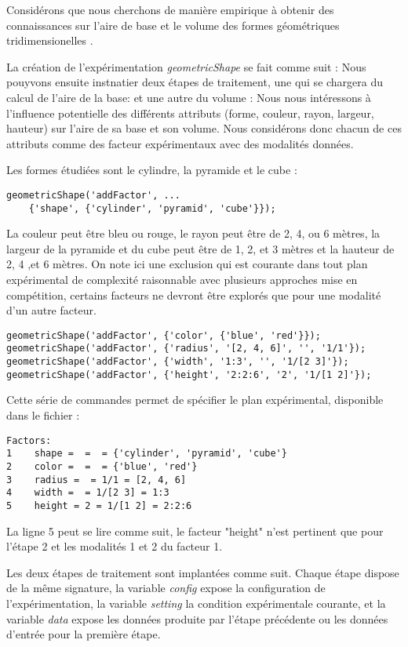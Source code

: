Considérons que nous cherchons de manière empirique à obtenir des connaissances sur l'aire de base et le volume des formes géométriques tridimensionelles .

La création de l'expérimentation \textsl{geometricShape} se fait comme suit :
Nous pouyvons ensuite instnatier deux étapes de traitement, une qui se chargera du calcul de l'aire de la base:
et une autre du volume :
Nous nous intéressons à l'influence potentielle des différents attributs (forme, couleur, rayon, largeur, hauteur) sur l'aire de sa base et son volume. Nous considérons donc chacun de ces attributs comme des facteur expérimentaux avec des modalités données.

Les formes étudiées sont le cylindre, la pyramide et le cube :
\begin{lstlisting}
geometricShape('addFactor', ...
	{'shape', {'cylinder', 'pyramid', 'cube'}});
\end{lstlisting}
La couleur peut être bleu ou rouge, le rayon peut être de 2, 4, ou 6 mètres, la largeur de la pyramide et du cube peut être de 1, 2, et 3 mètres et la hauteur de 2, 4 ,et 6 mètres. On note ici une exclusion qui est courante dans tout plan expérimental de complexité raisonnable avec plusieurs approches mise en compétition, certains facteurs ne devront être explorés que pour une modalité d'un autre facteur.
\begin{lstlisting}
geometricShape('addFactor', {'color', {'blue', 'red'}});
geometricShape('addFactor', {'radius', '[2, 4, 6]', '', '1/1'});
geometricShape('addFactor', {'width', '1:3', '', '1/[2 3]'});
geometricShape('addFactor', {'height', '2:2:6', '2', '1/[1 2]'});
\end{lstlisting}
Cette série de commandes permet de spécifier le plan expérimental, disponible dans le fichier  :
\begin{lstlisting}
Factors:
1    shape =  =  = {'cylinder', 'pyramid', 'cube'}
2    color =  =  = {'blue', 'red'}
3    radius =  = 1/1 = [2, 4, 6]
4    width =  = 1/[2 3] = 1:3
5    height = 2 = 1/[1 2] = 2:2:6
\end{lstlisting}
La ligne 5 peut se lire comme suit, le facteur "height" n'est pertinent que pour l'étape 2 et les modalités 1 et 2 du facteur 1.

Les deux étapes de traitement sont implantées comme suit. Chaque étape dispose de la même signature, la variable \textsl{config} expose la configuration de l'expérimentation, la variable \textsl{setting} la condition expérimentale courante, et la variable \textsl{data} expose les données produite par l'étape précédente ou les données d'entrée pour la première étape.

